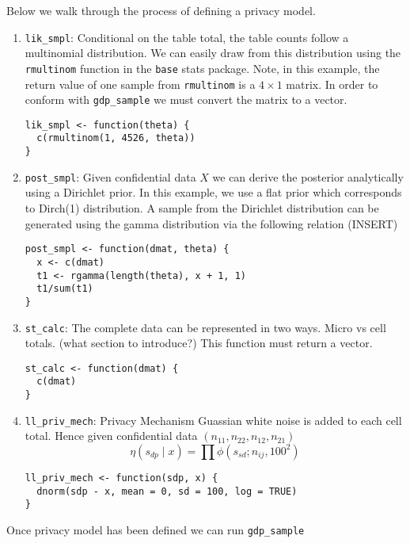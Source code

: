 Below we walk through the process of defining a privacy model.

\begin{enumerate}
\def\labelenumi{\arabic{enumi}.}
\item
  \texttt{lik\_smpl}: Conditional on the table total, the table counts follow a multinomial
  distribution. We can easily draw from this distribution using the
  \texttt{rmultinom} function in the \texttt{base} stats package. Note, in this example,
  the return value of one sample from \texttt{rmultinom} is a \(4 \times 1\) matrix. In order to
  conform with \texttt{gdp\_sample} we must convert the matrix to a vector.

\begin{verbatim}
lik_smpl <- function(theta) {
  c(rmultinom(1, 4526, theta))
}
\end{verbatim}
\item
  \texttt{post\_smpl}: Given confidential data \(X\) we can derive the posterior analytically
  using a Dirichlet prior. In this example, we use a flat prior which
  corresponds to Dirch(1) distribution. A sample from the Dirichlet distribution
  can be generated using the gamma distribution via the following relation (INSERT)

\begin{verbatim}
post_smpl <- function(dmat, theta) {
  x <- c(dmat)
  t1 <- rgamma(length(theta), x + 1, 1)
  t1/sum(t1)
}
\end{verbatim}
\item
  \texttt{st\_calc}: The complete data can be represented in two ways. Micro vs cell totals.
  (what section to introduce?) This function must return a vector.

\begin{verbatim}
st_calc <- function(dmat) {
  c(dmat)
}
\end{verbatim}
\item
  \texttt{ll\_priv\_mech}: Privacy Mechanism
  Guassian white noise is added to each cell total. Hence given
  confidential data \((n_{11}, n_{22}, n_{12}, n_{21})\)
  \[
  \eta(s_{dp} \mid x) = \prod \phi(s_{sd}; n_{ij}, 100^2)
  \]

\begin{verbatim}
ll_priv_mech <- function(sdp, x) {
  dnorm(sdp - x, mean = 0, sd = 100, log = TRUE)
}
\end{verbatim}
\end{enumerate}

Once privacy model has been defined we can run \texttt{gdp\_sample}

